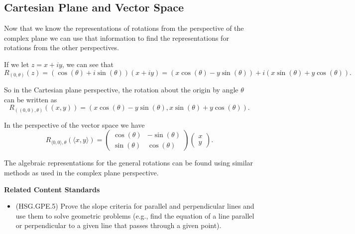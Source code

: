 \documentclass[
]{book}
\providecommand{\tightlist}{%
  \setlength{\itemsep}{0pt}\setlength{\parskip}{0pt}}
\newenvironment{standards}{}{}
\theoremstyle{definition}
\theoremstyle{definition}
\theoremstyle{definition}
\theoremstyle{definition}
\theoremstyle{remark}
\begin{document}
\hypertarget{cartesian-plane-and-vector-space-1}{%
\subsection{Cartesian Plane and Vector Space}\label{cartesian-plane-and-vector-space-1}}

Now that we know the representations of rotations from the perspective of the complex plane we can use that information to find the representations for rotations from the other perspectives.

If we let \(z=x+iy\), we can see that \[R_{(0,\theta)}(z) = (\cos(\theta) + i \sin(\theta)) (x+iy) = \left(x\cos(\theta) - y \sin(\theta)\right) + i \left(x\sin(\theta) + y \cos(\theta) \right).\]

So in the Cartesian plane perspective, the rotation about the origin by angle \(\theta\) can be written as \[R_{\left((0,0),\theta\right)}\left((x,y)\right)= \left( x \cos(\theta)-y\sin(\theta), x\sin(\theta)+y\cos(\theta)\right).\]

In the perspective of the vector space we have
\[R_{\langle 0,0\rangle, \theta} \left( \langle x,y\rangle \right) = \begin{pmatrix} \cos(\theta) & -\sin(\theta) \\ \sin(\theta) & \cos(\theta) \end{pmatrix} \begin{pmatrix} x \\ y \end{pmatrix} .\]

The algebraic representations for the general rotations can be found using similar methods as used in the complex plane perspective.

\begin{standards}

\begin{center}
\textbf{Related Content Standards}

\end{center}

\begin{itemize}
\tightlist
\item
  (HSG.GPE.5) Prove the slope criteria for parallel and perpendicular lines and use them to solve geometric problems (e.g., find the equation of a line parallel or perpendicular to a given line that passes through a given point).
\end{itemize}

\end{standards}
\end{document}
